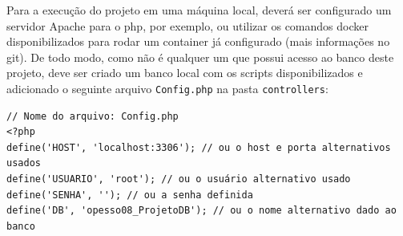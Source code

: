 \documentclass[12pt]{article}
\begin{document}
Para a execução do projeto em uma máquina local, deverá ser configurado um servidor Apache para o php, por exemplo, ou utilizar os comandos docker disponibilizados para rodar um container já configurado (mais informações no git). De todo modo, como não é qualquer um que possui acesso ao banco deste projeto, deve ser criado um banco local com os scripts disponibilizados e adicionado o seguinte arquivo \texttt{Config.php} na pasta \texttt{controllers}:

\begin{lstlisting}
// Nome do arquivo: Config.php
<?php
define('HOST', 'localhost:3306'); // ou o host e porta alternativos usados 
define('USUARIO', 'root'); // ou o usuário alternativo usado
define('SENHA', ''); // ou a senha definida
define('DB', 'opesso08_ProjetoDB'); // ou o nome alternativo dado ao banco
\end{lstlisting}
\end{document}
